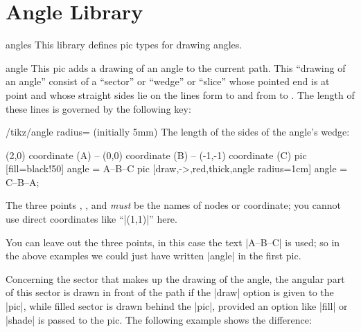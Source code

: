 %
%
%


\section{Angle Library}

\label{section-angle}

\begin{tikzlibrary}{angles}
  This library defines pic types for drawing angles.
\end{tikzlibrary}

\begin{pictype}{angle}{}
  This pic adds a drawing of an angle to the current path. This
  ``drawing of an angle'' consist of a ``sector'' or ``wedge'' or
  ``slice'' whose pointed end is at point  and whose straight
  sides lie on the lines form  to  and from 
  to . The length of these lines is governed by the following
  key:
  \begin{key}{/tikz/angle radius= (initially 5mm)}
    The length of the sides of the angle's wedge:
\begin{codeexample}[]
\tikz \draw (2,0) coordinate (A) -- (0,0) coordinate (B)
         -- (-1,-1) coordinate (C)
           pic [fill=black!50]                      {angle = A--B--C}
           pic [draw,->,red,thick,angle radius=1cm] {angle = C--B--A};
\end{codeexample}
  \end{key}

  The three points , , and  \emph{must} be the
  names of nodes or coordinate; you cannot use direct coordinates like
  ``|(1,1)|'' here.

  You can leave out the three points, in this case the text |A--B--C|
  is used; so in the above examples we could just have written
  |{angle}| in the first pic.

  Concerning the sector that makes up the drawing of the angle, the
  angular part of this sector is drawn in front of the path if the
  |draw| option is given to the |pic|, while filled sector is drawn
  behind the |pic|, provided an option like |fill| or |shade| is
  passed to the pic. The following example shows the difference:


\end{pictype}
